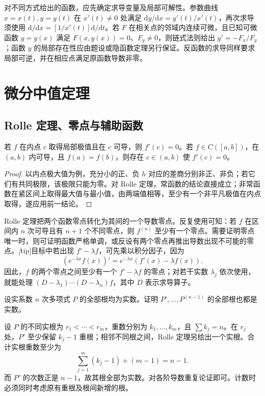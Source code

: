 对不同方式给出的函数，应先确定求导变量及局部可解性。参数曲线 $x=x(t),y=y(t)$ 在 $x'(t)\ne0$ 处满足 $\mathrm dy/\mathrm dx=y'(t)/x'(t)$，再次求导须使用 $\mathrm d/\mathrm dx=[1/x'(t)]\mathrm d/\mathrm dt$。若 $F$ 在相关点的邻域内连续可微，且已知可微函数 $y=y(x)$ 满足 $F(x,y(x))=0$、$F_y\ne0$，则链式法则给出 $y'=-F_x/F_y$；函数 $y$ 的局部存在性应由题设或隐函数定理另行保证。反函数的求导同样要求局部可逆，并在相应点满足原函数导数非零。

\section{微分中值定理}
\label{sec:pei-diff-mean-value}

\subsection{Rolle 定理、零点与辅助函数}

\begin{theorem}
若 $f$ 在内点 $c$ 取得局部极值且在 $c$ 可导，则 $f'(c)=0$。若 $f\in C([a,b])$，在 $(a,b)$ 内可导，且 $f(a)=f(b)$，则存在 $c\in(a,b)$ 使 $f'(c)=0$。
\end{theorem}
\begin{proof}
以内点极大值为例，充分小的正、负 $h$ 对应的差商分别非正、非负；若它们有共同极限，该极限只能为零。对 Rolle 定理，常函数的结论直接成立；非常函数在紧区间上取得最大值与最小值，由两端值相等，至少有一个非平凡极值在内点取得，遂应用前一结论。
\end{proof}

Rolle 定理把两个函数零点转化为其间的一个导数零点。反复使用可知：若 $f$ 在区间内 $n$ 次可导且有 $n+1$ 个不同零点，则 $f^{(n)}$ 至少有一个零点。需要证明零点唯一时，则可证明函数严格单调，或反设有两个零点再推出导数出现不可能的零点。\emph[tip]{目标中若出现 $f'-\lambda f$，可先乘以积分因子}，因为
\[
 (e^{-\lambda x}f(x))'=e^{-\lambda x}(f'(x)-\lambda f(x)).
\]
因此，$f$ 的两个零点之间至少有一个 $f'-\lambda f$ 的零点；对若干实数 $\lambda_j$ 依次使用，就能处理 $(D-\lambda_1)\cdots(D-\lambda_n)f$，其中 $D$ 表示求导算子。

\begin{example}
\label{ex:pei-diff-real-roots}
设实系数 $n$ 次多项式 $P$ 的全部根均为实数。证明 $P',\ldots,P^{(n-1)}$ 的全部根也都是实数。
\end{example}
\begin{solve}
设 $P$ 的不同实根为 $r_1<\cdots<r_m$，重数分别为 $k_1,\ldots,k_m$，且 $\sum k_j=n$。在 $r_j$ 处，$P'$ 至少保留 $k_j-1$ 重根；相邻不同根之间，Rolle 定理另给出一个实根。合计实根重数至少为
\[
 \sum_{j=1}^m(k_j-1)+(m-1)=n-1.
\]
而 $P'$ 的次数正是 $n-1$，故其根全部为实数。对各阶导数重复论证即可。计数时必须同时考虑原有重根及根间新增的根。
\end{solve}

